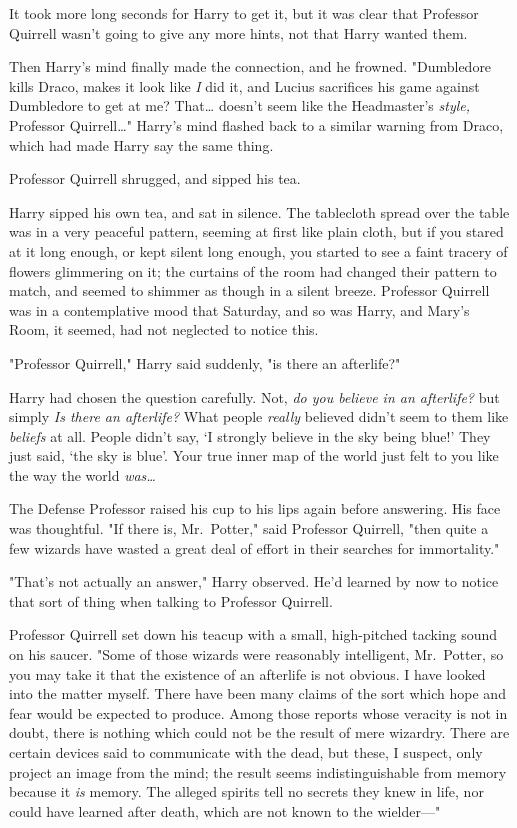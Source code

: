 It took more long seconds for Harry to get it, but it was clear that Professor 
Quirrell wasn't going to give any more hints, not that Harry wanted them.

Then Harry's mind finally made the connection, and he frowned. "Dumbledore 
kills Draco, makes it look like \emph{I} did it, and Lucius sacrifices his game 
against Dumbledore to get at me? That{\ldots} doesn't seem like the 
Headmaster's \emph{style,} Professor Quirrell{\ldots}" Harry's mind flashed 
back to a similar warning from Draco, which had made Harry say the same thing.

Professor Quirrell shrugged, and sipped his tea.

Harry sipped his own tea, and sat in silence. The tablecloth spread over the 
table was in a very peaceful pattern, seeming at first like plain cloth, but if 
you stared at it long enough, or kept silent long enough, you started to see a 
faint tracery of flowers glimmering on it; the curtains of the room had changed 
their pattern to match, and seemed to shimmer as though in a silent breeze. 
Professor Quirrell was in a contemplative mood that Saturday, and so was Harry, 
and Mary's Room, it seemed, had not neglected to notice this.

"Professor Quirrell," Harry said suddenly, "is there an afterlife?"

Harry had chosen the question carefully. Not, \emph{do you believe in an 
afterlife?} but simply \emph{Is there an afterlife?} What people \emph{really} 
believed didn't seem to them like \emph{beliefs} at all. People didn't say, `I 
strongly believe in the sky being blue!' They just said, `the sky is blue'. 
Your true inner map of the world just felt to you like the way the world 
\emph{was{\ldots}}

The Defense Professor raised his cup to his lips again before answering. His 
face was thoughtful. "If there is, Mr.~Potter," said Professor Quirrell, "then 
quite a few wizards have wasted a great deal of effort in their searches for 
immortality."

"That's not actually an answer," Harry observed. He'd learned by now to notice 
that sort of thing when talking to Professor Quirrell.

Professor Quirrell set down his teacup with a small, high-pitched tacking sound 
on his saucer. "Some of those wizards were reasonably intelligent, Mr.~Potter, 
so you may take it that the existence of an afterlife is not obvious. I have 
looked into the matter myself. There have been many claims of the sort which 
hope and fear would be expected to produce. Among those reports whose veracity 
is not in doubt, there is nothing which could not be the result of mere 
wizardry. There are certain devices said to communicate with the dead, but 
these, I suspect, only project an image from the mind; the result seems 
indistinguishable from memory because it \emph{is} memory. The alleged spirits 
tell no secrets they knew in life, nor could have learned after death, which 
are not known to the wielder---"

